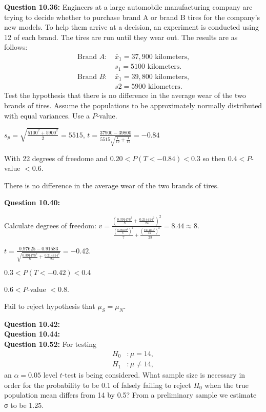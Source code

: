 \documentclass{article}
\begin{document}
\textbf{Question 10.36:}
Engineers at a large automobile manufacturing 
company are trying to decide whether to purchase
brand A or brand B tires for the company’s new models. 
To help them arrive at a decision, an experiment
is conducted using 12 of each brand. The tires are run
until they wear out. The results are as follows:
\begin{align*}
    \text{Brand }A \text{: }& \bar{x}_1 = 37,900 \text{ kilometers,}\\
    &s_1 = 5100 \text{ kilometers.}\\
    \text{Brand }B \text{: }& \bar{x}_1 = 39,800 \text{ kilometers,}\\
    &s 2 = 5900 \text{ kilometers.}
\end{align*}
Test the hypothesis that there is no difference in the
average wear of the two brands of tires. Assume the
populations to be approximately normally distributed
with equal variances. Use a $P$-value.
\begin{description}
    \item $s_p=\sqrt{\frac{5100^2+5900^2}{2}}=5515$, $t=\frac{37900-39800}{5515\sqrt{\frac{1}{12}+\frac{1}{12}}}=-0.84$
    \item With 22 degrees of freedome and $0.20<P(T<-0.84) < 0.3$ so then $0.4 < P$-value $<0.6$.
    \item There is no difference in the average wear of the two brands of tires.
\end{description}

\textbf{Question 10.40:}
\begin{description}
    \item Calculate degrees of freedom: $v=\frac{(\frac{0.391478^2}{8} + \frac{0.214414^2}{24})^2}
    {\frac{(\frac{0.391478^2}{8})^2}{7} + \frac{(\frac{0.214414^2}{24})^2}{23}} = 8.44 \approx 8$.
    \item $t = \frac{0.97625 - 0.91583}{\sqrt{\frac{0.391478^2}{8}+\frac{0.214414^2}{24}}}=-0.42$.
    \item $0.3 < P(T<-0.42) < 0.4$
    \item $0.6 < P$-value $<0.8$.
    \item Fail to reject hypothesis that $\mu_S = \mu_N$.
\end{description}

\textbf{Question 10.42:}
\\
\textbf{Question 10.44:}
\\
\textbf{Question 10.52:}
For testing
\begin{align*}
    H_0 &: \mu = 14,\\
    H_1 &: \mu \not= 14,
\end{align*}
an $\alpha = 0.05$ level $t$-test is being considered. What 
sample size is necessary in order for the probability to be
0.1 of falsely failing to reject $H_0$ when the true 
population mean differs from 14 by 0.5? From a preliminary
sample we estimate σ to be 1.25.
\newline
\end{document}

